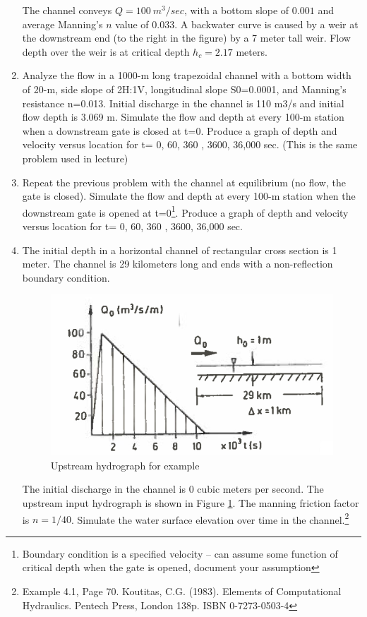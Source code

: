 \documentclass[12pt]{article}
\begin{document}
\begin{enumerate}
The channel conveys $Q=100~m^3/sec$, with a bottom slope of $0.001$ and average Manning's $n$ value of $0.033$.  
A backwater curve is caused by a weir at the downstream end (to the right in the figure) by a 7 meter tall weir.
Flow depth over the weir is at critical depth $h_c = 2.17$ meters.  %

\item Analyze the flow in a 1000-m long trapezoidal channel with a bottom width of 20-m, side slope of 2H:1V, longitudinal slope S0=0.0001, and Manning's resistance n=0.013. Initial discharge in the channel is 110 m3/s and initial flow depth is 3.069 m. Simulate the flow and depth at every 100-m station when a downstream gate is closed at t=0. Produce a graph of depth and velocity versus location for t= 0, 60, 360 , 3600, 36,000 sec. (This is the same problem used in lecture)

\item Repeat the previous problem with the channel at equilibrium (no flow, the gate is closed).  Simulate the flow and depth at every 100-m station when the  downstream gate is opened at t=0\footnote{Boundary condition is a specified velocity -- can assume some function of critical depth when the gate is opened, document your assumption}. Produce a graph of depth and velocity versus location for t= 0, 60, 360 , 3600, 36,000 sec. 

\item The initial depth in a horizontal channel of rectangular cross section is 1 meter. 
The channel is 29 kilometers long and ends with a non-reflection boundary condition.
\newpage
\begin{figure}[h!] %
   \centering
   \includegraphics[width=4.25in]{upstreamHydro.jpg} 
   \caption{Upstream hydrograph for example}
   \label{fig:upstreamHydro}
\end{figure}

The initial discharge in the channel is 0 cubic meters per second. 
The upstream input hydrograph is shown in Figure \ref{fig:upstreamHydro}.
The manning friction factor is $n=1/40$.
Simulate the water surface elevation over time in the channel.\footnote{Example 4.1, Page 70. Koutitas, C.G. (1983). Elements of Computational Hydraulics. Pentech Press, London 138p. ISBN 0-7273-0503-4 }
\end{enumerate}

\end{document}
